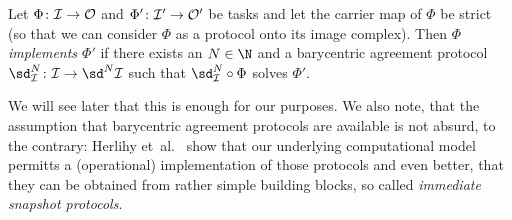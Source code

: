 \begin{thDef}
    Let $\Phi\colon\mathcal{I}\to\mathcal{O}$ and $\Phi'\colon\mathcal{I}'\to\mathcal{O}'$ be tasks and
    let the carrier map of $\Phi$ be strict (so that we can consider $\Phi$
    as a protocol onto its image complex). Then \emph{$\Phi$ implements
    $\Phi'$} if there exists an $N\in\N$ and a barycentric agreement protocol
    $\sd_{\cI}^N\colon\cI\to\sd^N\cI$ such that
    $\sd_{\cI}^N \after \Phi$ solves $\Phi'$.
\end{thDef}

We will see later %
that this is enough for our purposes. We also note, that the assumption
that barycentric agreement protocols are available is not absurd, to the
contrary: Herlihy et~al.~\cite{bookc:herlihyetal13} %
show that our underlying computational model permitts a (operational)
implementation of those protocols and even better, that they can be
obtained from rather simple building blocks, so called \emph{immediate
snapshot protocols}.
